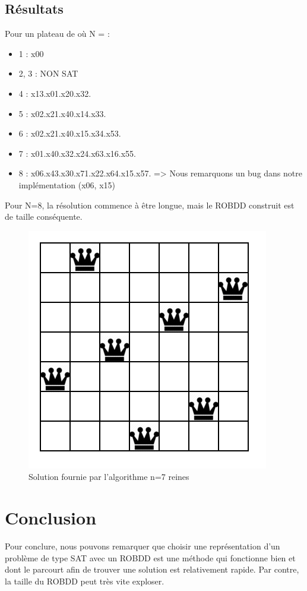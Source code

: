 \documentclass{article}
\begin{document}
\subsection{Résultats}
Pour un plateau de où N = :
\begin{itemize}
  \item 1 : x00
  \item 2, 3 : NON SAT
  \item 4 : x13.x01.x20.x32.
  \item 5 : x02.x21.x40.x14.x33.
  \item 6 : x02.x21.x40.x15.x34.x53.
  \item 7 : x01.x40.x32.x24.x63.x16.x55.
  \item 8 : x06.x43.x30.x71.x22.x64.x15.x57. => Nous remarquons un bug dans notre implémentation (x06, x15)
\end{itemize}
Pour N=8, la résolution commence à être longue, mais le ROBDD construit est de taille conséquente.
\begin{figure}
	\begin{center}
		\includegraphics[scale=0.7]{sevenkingdom}\\
		Solution fournie par l'algorithme n=7 reines
	\end{center}
\end{figure}
\section{Conclusion}
Pour conclure, nous pouvons remarquer que choisir une représentation d'un problème de type SAT avec un ROBDD est une méthode qui fonctionne bien et dont le parcourt afin de trouver une solution est relativement rapide. Par contre, la taille du ROBDD peut très vite exploser.
\end{document}
